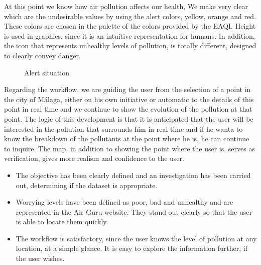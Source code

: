 At this point we know how air pollution affects our health, We make very clear which are the undesirable values by using the alert colors, yellow, orange and 
red. These colors are chosen in the palette of the colors provided by the EAQI.
Height is used in graphics, since it is an intuitive representation for humans. In addition, the icon that represents unhealthy levels of pollution, is
totally different, designed to clearly convey danger. \\

\begin{figure}[ht]
    \centering
    \hfill
    \caption{Alert situation}
\end{figure}

Regarding the workflow, we are guiding the user from the selection of a point in the city of Málaga, either on his own initiative
or automatic to the details of this point in real time and we continue to show  the evolution of the pollution at that point.
The logic of this development is that it is anticipated that the user will be interested in the pollution that surrounds him in real time and if
he wanta to know the breakdown of the pollutants at the point where he is, he can continue to inquire. The map, in addition to showing
the point where the user is, serves as verification, gives more realism and confidence to the user.

\begin{itemize}
    \item The objective has been clearly defined and an investigation has been carried out, determining if the dataset is appropriate.
    \item Worrying levels have been defined as poor, bad and unhealthy and are represented in the Air Guru website. They stand out clearly so that the user is able to locate them quickly.
    \item The workflow is satisfactory, since the user knows the level of pollution at any location, at a simple glance. It is easy to explore the information further, if the user wishes.
\end{itemize}